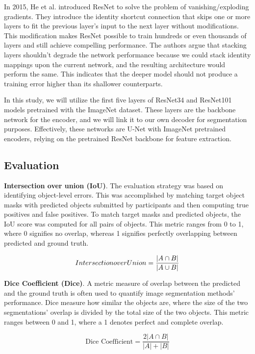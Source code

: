 \documentclass[conference]{IEEEtran}
\begin{document}
In 2015, He et al.\cite{he2016deep} introduced ResNet to solve the problem of vanishing/exploding gradients. They introduce the identity shortcut connection that skips one or more layers to fit the previous layer's input to the next layer without modifications. This modification makes ResNet possible to train hundreds or even thousands of layers and still achieve compelling performance. The authors argue that stacking layers shouldn't degrade the network performance because we could stack identity mappings upon the current network, and the resulting architecture would perform the same. This indicates that the deeper model should not produce a training error higher than its shallower counterparts.

In this study, we will utilize the first five layers of ResNet34 and ResNet101 models pretrained with the ImageNet dataset. These layers are the backbone network for the encoder, and we will link it to our own decoder for segmentation purposes. Effectively, these networks are U-Net with ImageNet pretrained encoders, relying on the pretrained ResNet backbone for feature extraction.

\subsection{Evaluation}

\textbf{Intersection over union (IoU)}. The evaluation strategy was based on identifying object-level errors. This was accomplished by matching target object masks with predicted objects submitted by participants and then computing true positives and false positives. To match target masks and predicted objects, the IoU score was computed for all pairs of objects. This metric ranges from 0 to 1, where 0 signifies no overlap, whereas 1 signifies perfectly overlapping between predicted and ground truth.

\begin{equation}
\mbox{Intersection over Union} = {{|A \cap B|}\over{|A \cup B|}}
\end{equation}

\textbf{Dice Coefficient (Dice)}. A metric measure of overlap between the predicted and the ground truth is often used to quantify image segmentation methods' performance. Dice measure how similar the objects are, where the size of the two segmentations' overlap is divided by the total size of the two objects. This metric ranges between 0 and 1, where a 1 denotes perfect and complete overlap.

\begin{equation}
\mbox{Dice Coefficient} = \frac{2 |A \cap B|}{|A| + |B|}
\end{equation}
\end{document}
